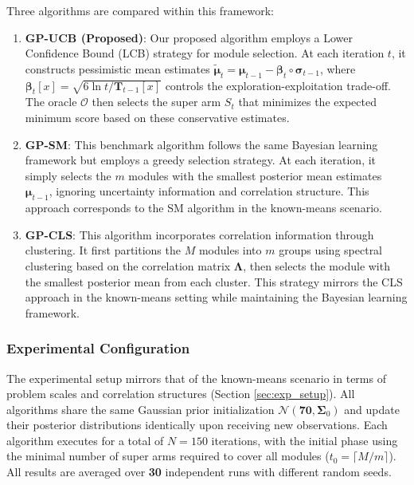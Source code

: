 \documentclass[opre,sglanonrev]{informs4}
\begin{document}
Three algorithms are compared within this framework:

\begin{enumerate}
    \item \textbf{GP-UCB (Proposed)}: Our proposed algorithm employs a Lower Confidence Bound (LCB) strategy for module selection. At each iteration $t$, it constructs pessimistic mean estimates $\boldsymbol{\tilde{\mu}}_t = \boldsymbol{\mu}_{t-1} - \boldsymbol{\beta}_t \circ \boldsymbol{\sigma}_{t-1}$, where $\boldsymbol{\beta}_t[x] = \sqrt{6 \ln t / \mathbf{T}_{t-1}[x]}$ controls the exploration-exploitation trade-off. The oracle $\mathcal{O}$ then selects the super arm $S_t$ that minimizes the expected minimum score based on these conservative estimates.

    \item \textbf{GP-SM}: This benchmark algorithm follows the same Bayesian learning framework but employs a greedy selection strategy. At each iteration, it simply selects the $m$ modules with the smallest posterior mean estimates $\boldsymbol{\mu}_{t-1}$, ignoring uncertainty information and correlation structure. This approach corresponds to the SM algorithm in the known-means scenario.

    \item \textbf{GP-CLS}: This algorithm incorporates correlation information through clustering. It first partitions the $M$ modules into $m$ groups using spectral clustering based on the correlation matrix $\boldsymbol{\Lambda}$, then selects the module with the smallest posterior mean from each cluster. This strategy mirrors the CLS approach in the known-means setting while maintaining the Bayesian learning framework.
\end{enumerate}

\subsubsection{Experimental Configuration}

The experimental setup mirrors that of the known-means scenario in terms of problem scales and correlation structures (Section \ref{sec:exp_setup}). All algorithms share the same Gaussian prior initialization $\mathcal{N}(\mathbf{70}, \mathbf{\Sigma}_0)$ and update their posterior distributions identically upon receiving new observations. Each algorithm executes for a total of $N = 150$ iterations, with the initial phase using the minimal number of super arms required to cover all modules ($t_0 = \lceil M/m \rceil$).
All results are averaged over \textbf{30} independent runs with different random seeds.
\end{document}
